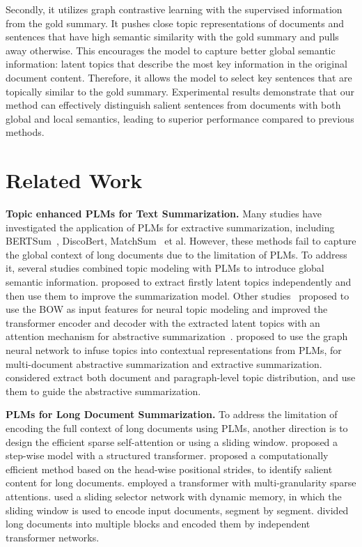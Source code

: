 \documentclass[11pt]{article}
\begin{document}
Secondly, it utilizes graph contrastive learning with the supervised information from the gold summary. 
It pushes close topic representations of documents and sentences that have high semantic similarity with the gold summary and pulls away otherwise.
This encourages the model to capture better global semantic information: latent topics that describe the most key information in the original document content. 
Therefore, it allows the model to select key sentences that are topically similar to the gold summary.
Experimental results demonstrate that our method can effectively distinguish salient sentences from documents with both global and local semantics, leading to superior performance compared to previous methods.



\section{Related Work}
\textbf{Topic enhanced PLMs for Text Summarization.}
Many studies have investigated the application of PLMs for extractive summarization, including BERTSum~\cite{liu2019text}, DiscoBert\cite{xu2020discourse}, MatchSum~\cite{zhong2020extractive} et al.
However, these methods fail to capture the global context of long documents due to the limitation of PLMs.
To address it, several studies combined topic modeling with PLMs to introduce global semantic information.
\citet{wang2020friendly} proposed to extract firstly latent topics independently and then use them to improve the summarization model. 
Other studies~\cite{aralikatte2021focus, nguyen2021enriching, cui2020enhancing} proposed to use the BOW as input features for neural topic modeling and improved the transformer encoder and decoder with the extracted latent topics with an attention mechanism for abstractive summarization~\cite{aralikatte2021focus, fu2020document, nguyen2021enriching}. 
\citet{cui2020enhancing, cui2021topic} proposed to use the graph neural network to infuse topics into contextual representations from PLMs, for multi-document abstractive summarization and extractive summarization.
\citet{fu2020document} considered extract both document and paragraph-level topic distribution, and use them to guide the abstractive summarization.


\textbf{PLMs for Long Document Summarization.}
To address the limitation of encoding the full context of long documents using PLMs, another direction is to design the efficient sparse self-attention or using a sliding window. 
\citet{narayan2020stepwise} proposed a step-wise model with a structured transformer.
\citet{huang2021efficient} proposed a computationally efficient method based on the head-wise positional strides, to identify salient content for long documents.
\citet{liu2021hetformer} employed a transformer with multi-granularity sparse attentions.
\citet{cui2021sliding} used a sliding selector network with dynamic memory, in which the sliding window is used to encode input documents, segment by segment.
\citet{grail2021globalizing} divided long documents into multiple blocks and encoded them by independent transformer networks. 
\end{document}
